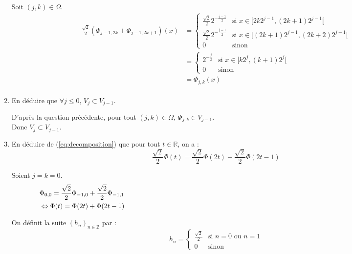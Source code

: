 \documentclass[12pt,a4paper]{article}
\begin{document}
\begin{enumerate}
    \color{blue}
    Soit $(j,k) \in \Omega$.
    \begin{align*}
        \frac{\sqrt{2}}{2} (\Phi_{j-1, 2k} + \Phi_{j-1, 2k+1})(x) &= \begin{cases}
            \frac{\sqrt{2}}{2} 2^{-\frac{j-1}{2}} & \text{si } x \in [2k2^{j-1}, (2k+1)2^{j-1}[ \\
            \frac{\sqrt{2}}{2} 2^{-\frac{j-1}{2}} & \text{si } x \in [(2k+1)2^{j-1}, (2k+2)2^{j-1}[ \\
            0 & \text{sinon}
        \end{cases}\\
        &= \begin{cases}
            2^{-\frac{j}{2}} & \text{si } x \in [k2^{j}, (k+1)2^{j}[ \\
            0 & \text{sinon}
        \end{cases} \\
        &= \Phi_{j,k}(x)\\
    \end{align*}


    \color{black}
    \item En déduire que $\forall j \leq 0$, $V_j \subset V_{j-1}$.
    
    \color{blue}
    D'après la question précédente, pour tout $(j,k) \in \Omega$, $\Phi_{j,k} \in V_{j-1}$.\\
    Donc $V_j \subset V_{j-1}$.\\


    \color{black}
    \item En déduire de (\ref{eq:decomposition}) que pour tout $t \in \mathbb{R}$, on a :
    \begin{equation}
        \frac{\sqrt{2}}{2} \Phi(t) = \frac{\sqrt{2}}{2} \Phi(2t) + \frac{\sqrt{2}}{2} \Phi(2t - 1)
        \label{eq:decomposition_phi}
    \end{equation}

    \color{blue}
    Soient $j = k = 0$.
    \begin{align*}
        \qquad &\Phi_{0,0} = \frac{\sqrt{2}}{2} \Phi_{-1,0} + \frac{\sqrt{2}}{2} \Phi_{-1,1} \hspace{14.5cm} \\
        &\Leftrightarrow \Phi(t) = \Phi(2t) + \Phi(2t - 1) \\
    \end{align*}


    \color{black}
    On définit la suite $(h_n)_{n \in \mathbb{Z}}$ par :
    $$
    h_n = \begin{cases}
        \frac{\sqrt{2}}{2} & \text{si } n = 0 \text{ ou } n = 1 \\
        0 & \text{sinon}
    \end{cases}
    $$


\end{enumerate}
\end{document}

